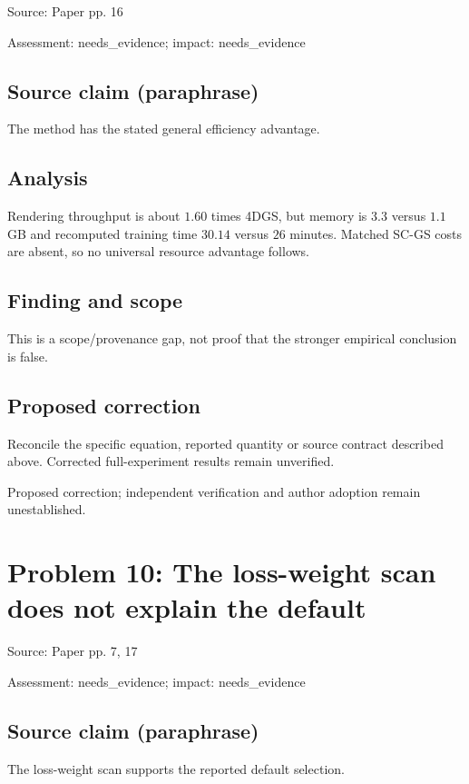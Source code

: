 \documentclass[11pt]{article}
\begin{document}
Source: Paper pp. 16

Assessment: needs\_evidence; impact: needs\_evidence

\subsection*{Source claim (paraphrase)}

The method has the stated general efficiency advantage.

\subsection*{Analysis}

Rendering throughput is about \(1.60\) times 4DGS, but memory is \(3.3\) versus \(1.1\) GB and recomputed training time \(30.14\) versus \(26\) minutes. Matched SC-GS costs are absent, so no universal resource advantage follows.

\subsection*{Finding and scope}

This is a scope/provenance gap, not proof that the stronger empirical conclusion is false.

\subsection*{Proposed correction}

Reconcile the specific equation, reported quantity or source contract described above. Corrected full-experiment results remain unverified.

Proposed correction; independent verification and author adoption remain unestablished.

\section*{Problem 10: The loss-weight scan does not explain the default}

Source: Paper pp. 7, 17

Assessment: needs\_evidence; impact: needs\_evidence

\subsection*{Source claim (paraphrase)}

The loss-weight scan supports the reported default selection.
\end{document}
